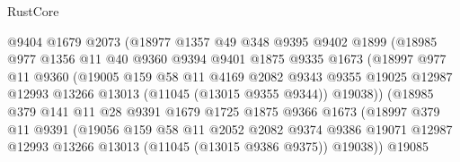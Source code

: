 \begin{lexlean}{RustCore}
\begin{coremodule}
                        @9404
                        @1679
                        @2073
                        (@18977
                          @1357
                          @49
                          @348
                          @9395
                          @9402
                          @1899
                          (@18985
                            @977
                            @1356
                            @11
                            @40
                            @9360
                            @9394
                            @9401
                            @1875
                            @9335
                            @1673
                            (@18997
                              @977
                              @11
                              @9360
                              (@19005
                                @159
                                @58
                                @11
                                @4169
                                @2082
                                @9343
                                @9355
                                @19025
                                @12987
                                @12993
                                @13266
                                @13013
                                (@11045 (@13015 @9355 @9344))
                                @19038))
                            (@18985
                              @379
                              @141
                              @11
                              @28
                              @9391
                              @1679
                              @1725
                              @1875
                              @9366
                              @1673
                              (@18997
                                @379
                                @11
                                @9391
                                (@19056
                                  @159
                                  @58
                                  @11
                                  @2052
                                  @2082
                                  @9374
                                  @9386
                                  @19071
                                  @12987
                                  @12993
                                  @13266
                                  @13013
                                  (@11045 (@13015 @9386 @9375))
                                  @19038))
                              @19085

\end{coremodule}
\end{lexlean}

